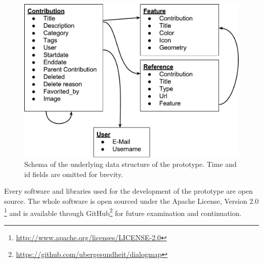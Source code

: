 \begin{figure}[!h]
    \centering
    \includegraphics[width=1\columnwidth]{images/data_structure}
    \caption{Schema of the underlying data structure of the prototype. Time and id fields are omitted for brevity.}
    \label{fig:data_structure}
\end{figure}

Every software and libraries used for the development of the prototype are open source. The whole software is open sourced under the Apache License, Version 2.0 \footnote{\url{http://www.apache.org/licenses/LICENSE-2.0}} and is available through GitHub\footnote{\url{https://github.com/ubergesundheit/dialogmap}} for future examination and continuation.


